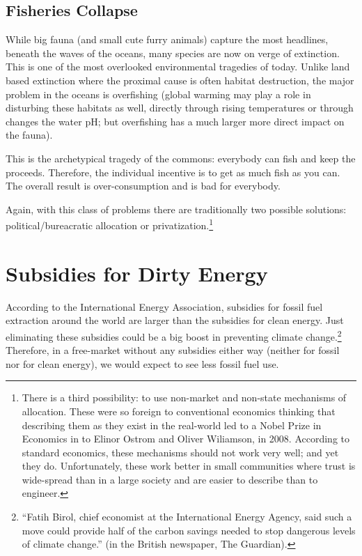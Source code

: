 
\subsection{Fisheries Collapse}

While big fauna (and small cute furry animals) capture the most headlines,
beneath the waves of the oceans, many species are now on verge of extinction.
This is one of the most overlooked environmental tragedies of today. Unlike
land based extinction where the proximal cause is often habitat destruction,
the major problem in the oceans is overfishing (global warming may play a role
in disturbing these habitats as well, directly through rising temperatures or
through changes the water pH; but overfishing has a much larger more direct
impact on the fauna).

This is the archetypical tragedy of the commons: everybody can fish and keep
the proceeds. Therefore, the individual incentive is to get as much fish as you
can. The overall result is over-consumption and is bad for everybody.

Again, with this class of problems there are traditionally two possible
solutions: political/bureacratic allocation or privatization.\footnote{There
is a third possibility: to use non-market and non-state mechanisms of
allocation. These were so foreign to conventional economics thinking that
describing them as they exist in the real-world led to a Nobel Prize in
Economics in to Elinor Ostrom and Oliver Wiliamson, in 2008. According to
standard economics, these mechanisms should not work very well; and yet they
do. Unfortunately, these work better in small communities where trust is
wide-spread than in a large society and are easier to describe than to
engineer.}

\section{Subsidies for Dirty Energy}

According to the International Energy Association, subsidies for fossil fuel
extraction around the world are larger than the subsidies for clean energy.
Just eliminating these subsidies could be a big boost in preventing climate
change.\footnote{``Fatih Birol, chief
economist at the International Energy Agency, said such a move could
provide half of the carbon savings needed to stop dangerous levels of climate
change.'' (in the British newspaper, The Guardian).%
} Therefore, in a free-market without any subsidies either way (neither for
fossil nor for clean energy), we would expect to see less fossil fuel use.

